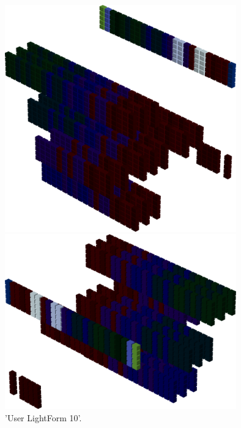 \begin{minipage}[b]{0.48\linewidth}
\vspace{2cm}
\begin{figure}[H]
    \centering
    \begin{adjustbox}{width=4cm,margin=0cm 0cm}
      \includegraphics[width=10cm]{src/colorspace_patterns/pattern18-45.png}%
    \end{adjustbox}
    \begin{adjustbox}{width=4cm,margin=0cm 0cm}
      \includegraphics[width=10cm]{src/colorspace_patterns/pattern18-225.png}%
    \end{adjustbox}
\caption{'User LightForm 10'.}
\end{figure}
\end{minipage}
